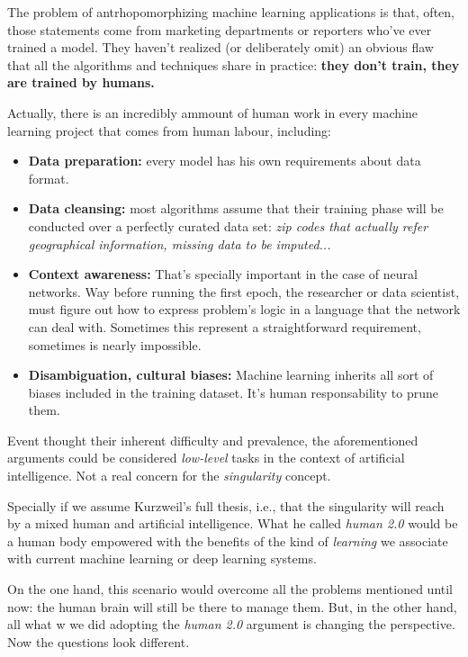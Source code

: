 The problem of antrhopomorphizing machine learning applications is that, often, 
those statements come from marketing departments or reporters who've ever trained 
a model. They haven't realized (or deliberately omit) an obvious flaw that all 
the algorithms and techniques share in practice: \textbf{they don't train, they 
are trained by humans.}

Actually, there is an incredibly ammount of human work in every machine learning 
project that comes from human labour, including: 

\begin{itemize}
	\item \textbf{Data preparation:} every model has his own requirements about 
		data format. 
	\item \textbf{Data cleansing:} most algorithms assume that their training 
		phase will be conducted over a perfectly curated data set: \textit{
		zip codes that actually refer geographical information, missing data 
		to be imputed...}
	\item \textbf{Context awareness:} That's specially important in the case 
		of neural networks. Way before running the first epoch, the researcher 
		or data scientist, must figure out how to express problem's logic in a 
		language that the network can deal with. Sometimes this represent a 
		straightforward requirement, sometimes is nearly impossible. 
	\item \textbf{Disambiguation, cultural biases:} Machine learning inherits 
		all sort of biases included in the training dataset. It's human responsability 
		to prune them.  
\end{itemize}

Event thought their inherent difficulty and prevalence, the aforementioned arguments 
could be considered \textit{low-level} tasks in the context of artificial 
intelligence. Not a real concern for the \textit{singularity} concept.

Specially if we assume Kurzweil's full thesis, i.e., that the singularity will 
reach by a mixed human and artificial intelligence. What he called \textit{human 
2.0} would be a human body empowered with the benefits of the kind of \textit{
learning} we associate with current machine learning or deep learning systems.

On the one hand, this scenario would overcome all the problems mentioned until now: 
the human brain will still be there to manage them. But, in the other hand, all what w
we did adopting the \textit{human 2.0} argument is changing the perspective. Now 
the questions look different.

